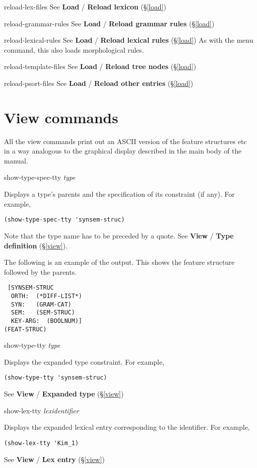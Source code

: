 \documentclass[12pt]{report}
\newcommand{\lispcommand}[1]{\noindent\rm #1}%
\begin{document}
\lispcommand{reload-lex-files}
See {\bf Load} / {\bf Reload lexicon} (\S\ref{load})

\lispcommand{reload-grammar-rules}
See {\bf Load} / {\bf Reload grammar rules} (\S\ref{load})

\lispcommand{reload-lexical-rules}
See {\bf Load} / {\bf Reload lexical rules} (\S\ref{load})
As with the menu command, this also loads morphological rules.

\lispcommand{reload-template-files}
See {\bf Load} / {\bf Reload tree nodes} (\S\ref{load})

\lispcommand{reload-psort-files}
See {\bf Load} / {\bf Reload other entries} (\S\ref{load})


\section{View commands}

All the view commands print out an ASCII version of the 
feature structures etc in a way analogous to the
graphical display described in the main body of the manual.

\lispcommand{show-type-spec-tty {\it type}}

Displays a type's parents 
and the specification of its constraint (if any).
For example,
\begin{verbatim}
(show-type-spec-tty 'synsem-struc)
\end{verbatim}
Note that the type name has to be preceded by a quote.
See {\bf View} / {\bf Type definition} (\S\ref{view}).

The following is an example of the output.
This shows the feature structure followed by the
parents.
\begin{verbatim}
 [SYNSEM-STRUC
  ORTH:  (*DIFF-LIST*)
  SYN:   (GRAM-CAT)
  SEM:   (SEM-STRUC)
  KEY-ARG:  (BOOLNUM)]
(FEAT-STRUC)
\end{verbatim}

\lispcommand{show-type-tty {\it type}}

Displays the expanded type constraint.
For example,
\begin{verbatim}
(show-type-tty 'synsem-struc)
\end{verbatim}
See {\bf View} / {\bf Expanded type} (\S\ref{view})

\lispcommand{show-lex-tty {\it lexidentifier}}

Displays the expanded lexical entry corresponding to the identifier.
For example,
\begin{verbatim}
(show-lex-tty 'Kim_1)
\end{verbatim}
See {\bf View} / {\bf Lex entry} (\S\ref{view})
\end{document}
